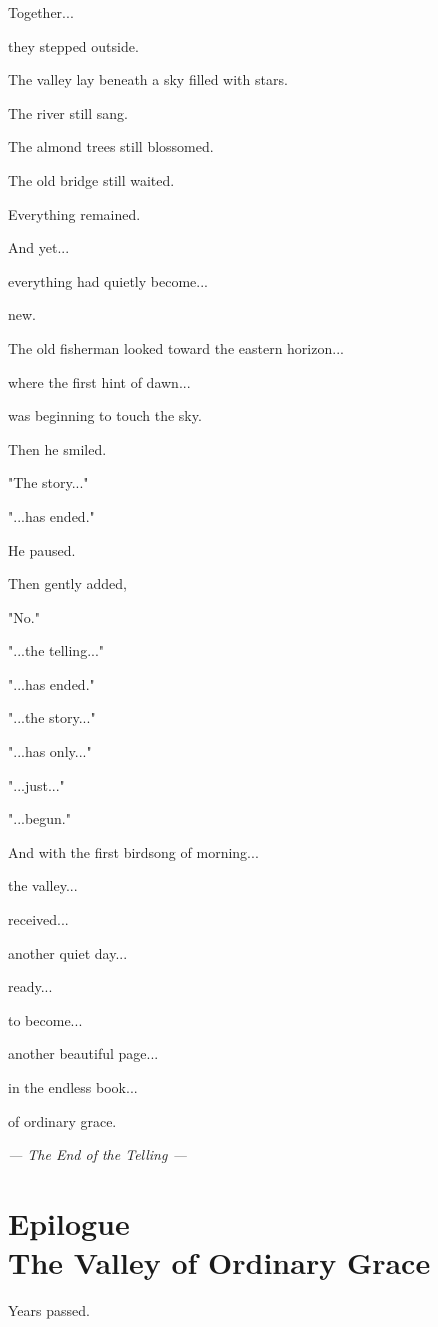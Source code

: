 \documentclass[12pt,openany]{book}
\begin{document}
Together...

they stepped outside.

The valley lay beneath a sky filled with stars.

The river still sang.

The almond trees still blossomed.

The old bridge still waited.

Everything remained.

And yet...

everything had quietly become...

new.

The old fisherman looked toward the eastern horizon...

where the first hint of dawn...

was beginning to touch the sky.

Then he smiled.

"The story..."

"...has ended."

He paused.

Then gently added,

"No."

"...the telling..."

"...has ended."

"...the story..."

"...has only..."

"...just..."

"...begun."

And with the first birdsong of morning...

the valley...

received...

another quiet day...

ready...

to become...

another beautiful page...

in the endless book...

of ordinary grace.

\begin{center}
\Large\textit{--- The End of the Telling ---}
\end{center}
\chapter*{Epilogue\\The Valley of Ordinary Grace}

Years passed.
\end{document}
